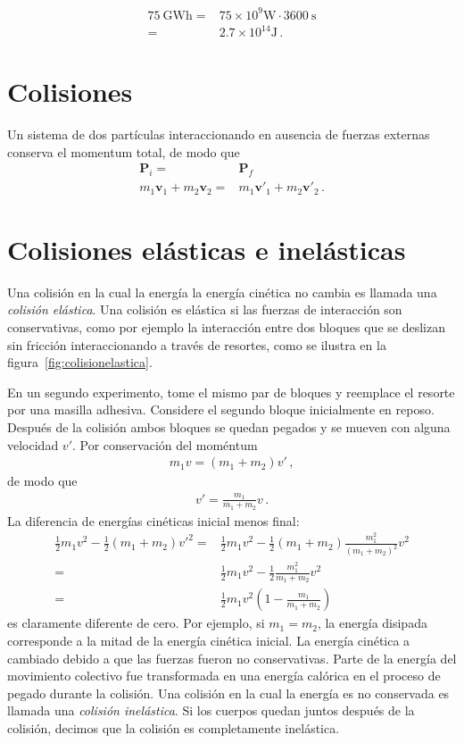 \begin{align*}
  \SI{75}{\giga\watt\hour}=&75\times 10^9\si{\watt}\cdot \SI{3600}{\second}\nonumber\\
  =&2.7\times 10^{14}\si{\joule}\,.
\end{align*}



\section{Colisiones}
Un sistema de dos partículas interaccionando en ausencia de fuerzas externas conserva el momentum total, de modo que
\begin{align}
  \mathbf{P}_i=&\mathbf{P}_f\nonumber\\
m_1\mathbf{v}_1+m_2\mathbf{v}_2=&m_1\mathbf{v}'_1+m_2\mathbf{v}'_2\,.
\end{align}


\section{Colisiones elásticas e inelásticas}
Una colisión en la cual la energía la energía cinética no cambia 
es llamada una \emph{colisión elástica}. Una colisión es elástica si
las fuerzas de interacción son conservativas, como por ejemplo la
interacción entre dos bloques que se deslizan sin fricción
interaccionando a través de resortes, como se ilustra en la
figura~\ref{fig:colisionelastica}.

En un segundo experimento, tome el mismo par de bloques y reemplace el
resorte por una masilla adhesiva. Considere el segundo bloque
inicialmente en reposo. Después de la colisión ambos bloques se quedan
pegados y se mueven con alguna velocidad $v'$. Por conservación del
moméntum
\begin{align}
  m_1 v=(m_1+m_2)v'\,,
\end{align}
de modo que
\begin{align}
  v'=\frac{m_1}{m_1+m_2}v\,.
\end{align}
La diferencia de energías cinéticas inicial menos final:
\begin{align}
  \tfrac{1}{2}m_1v^2-\tfrac{1}{2}(m_1+m_2)v'^2=&
  \tfrac{1}{2}m_1v^2-\tfrac{1}{2}(m_1+m_2)\frac{m_1^2}{(m_1+m_2)^2}v^2\nonumber\\
  =&\tfrac{1}{2}m_1v^2-\tfrac{1}{2}\frac{m_1^2}{m_1+m_2}v^2\nonumber\\
  =&\tfrac{1}{2}m_1v^2  \left(1-\frac{m_1}{m_1+m_2} \right)
\end{align}
es claramente diferente de cero. Por ejemplo, si $m_1=m_2$, la energía
disipada corresponde a la mitad de la energía cinética inicial. La
energía cinética a cambiado debido a que las fuerzas fueron no
conservativas. Parte de la energía del movimiento colectivo fue
transformada en una energía calórica en el proceso de pegado durante
la colisión. Una colisión en la cual la energía es no conservada es
llamada una \emph{colisión inelástica}. Si los cuerpos quedan juntos
después de la colisión, decimos que la colisión es completamente
inelástica.


